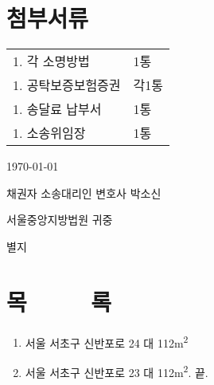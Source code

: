 \documentclass[12pt]{oblivoir}
\def\mysection#1{\hfil #1 \hfil} %
\begin{document}
\section*{\mysection{첨부서류}}
\vspace{2em}
\begin{tabu}to \linewidth{X X}
  1. 각 소명방법&1통\\
  1. 공탁보증보험증권&각1통\\
  1. 송달료 납부서&1통\\
  1. 소송위임장&1통
\end{tabu}
\par\vspace{5em}
\centering\today{}\par
{}
\raggedleft 채권자 소송대리인 변호사 박소신\\
\raggedright 서울중앙지방법원 귀중
\par





\newpage
{} %
별지\\
\bigskip
\section*{\mysection{목~~~~~록}}
\begin{enumerate}
\item 서울 서초구 신반포로 24 대 112\si{\square\metre}\\
\item 서울 서초구 신반포로 23 대 112\si{\square\metre}. 끝.\\
\end{enumerate}
\end{document}
